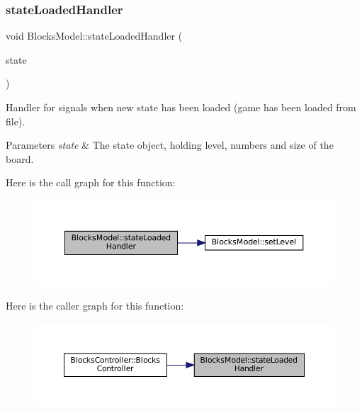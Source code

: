 \subsubsection{\texorpdfstring{stateLoadedHandler}{stateLoadedHandler}}
{\footnotesize\ttfamily void Blocks\+Model\+::state\+Loaded\+Handler (\begin{DoxyParamCaption}\item[{const \mbox{\hyperlink{struct_load_state}{Load\+State}} \&}]{state }\end{DoxyParamCaption})\hspace{0.3cm}{\ttfamily [slot]}}



Handler for signals when new state has been loaded (game has been loaded from file). 


\begin{DoxyParams}{Parameters}
{\em state} & The state object, holding level, numbers and size of the board. \\
\hline
\end{DoxyParams}
Here is the call graph for this function\+:
\nopagebreak
\begin{figure}[H]
\begin{center}
\leavevmode
\includegraphics[width=350pt]{class_blocks_model_a9fc884d31e972c84e2e3dcbce73b8377_cgraph}
\end{center}
\end{figure}
Here is the caller graph for this function\+:
\nopagebreak
\begin{figure}[H]
\begin{center}
\leavevmode
\includegraphics[width=350pt]{class_blocks_model_a9fc884d31e972c84e2e3dcbce73b8377_icgraph}
\end{center}
\end{figure}
\mbox{\label{class_blocks_model_a6707a7dac44d269c2d52e7904a7473ef}} 
